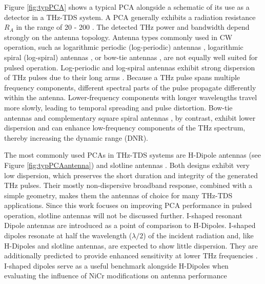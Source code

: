 Figure \ref{fig:typPCA} shows a typical PCA alongside a schematic of its use as a detector in a THz-TDS system. A PCA generally exhibits a radiation resistance $R_A$ in the range of \num{20} - \num{200} \si{\Omega}. The detected THz power and bandwidth depend strongly on the antenna topology. Antenna types commonly used in CW operation, such as logarithmic periodic (log-periodic) antennas \cite{mendisTunableCWTHzSystem2004}, logarithmic spiral (log-spiral) antennas \cite{linRoomtemperatureContinuouswaveTerahertz2025}, or bow-tie antennas \cite{PDFBowtieWideband}, are not equally well suited for pulsed operation. Log-periodic and log-spiral antennas exhibit strong dispersion of THz pulses due to their long arms \cite{fernandezolveraDispersivePropertiesSelfcomplementary2017a}. Because a THz pulse spans multiple frequency components, different spectral parts of the pulse propagate differently within the antenna. Lower-frequency components with longer wavelengths travel more slowly, leading to temporal spreading and pulse distortion. Bow-tie antennas and complementary square spiral antennas \cite{HighPowerGeneration}, by contrast, exhibit lower dispersion and can enhance low-frequency components of the THz spectrum, thereby increasing the dynamic range (DNR).

The most commonly used PCAs in THz-TDS systems are H-Dipole antennas \cite{nandi1550nmDrivenErAs2018} (see Figure \ref{fig:typPCAantenna}) and slotline antennas \cite{kohlhaasPhotoconductiveTerahertzDetectors2019}. Both designs exhibit very low dispersion, which preserves the short duration and integrity of the generated THz pulses. Their  mostly non-dispersive broadband response, combined with a simple geometry, makes them the antennas of choice for many THz-TDS applications. Since this work focuses on improving PCA performance in pulsed operation, slotline antennas will not be discussed further. I-shaped resonant Dipole antennas are introduced as a point of comparison to H-Dipoles. I-shaped dipoles resonate at half the wavelength ($\lambda/2$) of the incident radiation and, like H-Dipoles and slotline antennas, are expected to show little dispersion. They are additionally predicted to provide enhanced sensitivity at lower THz frequencies \cite{nguyenPhotoconductiveDipoleAntennas2017}. I-shaped dipoles serve as a useful benchmark alongside H-Dipoles when evaluating the influence of NiCr modifications on antenna performance

